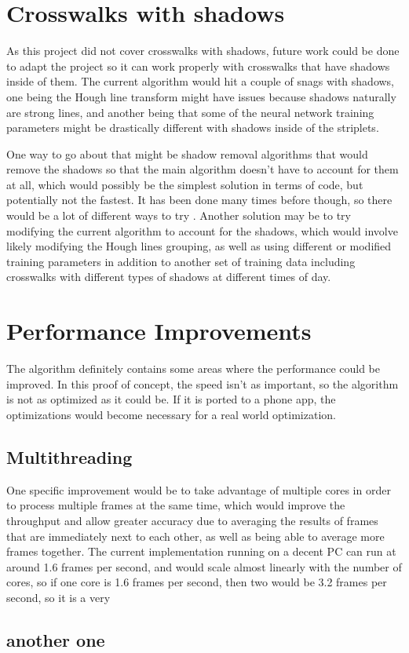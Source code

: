 \documentclass[12pt]{ucthesis}
\begin{document}
\section{Crosswalks with shadows}

As this project did not cover crosswalks with shadows, future work could be done to adapt the project so it can work properly with crosswalks that have shadows inside of them. The current algorithm would hit a couple of snags with shadows, one being the Hough line transform might have issues because shadows naturally are strong lines, and another being that some of the neural network training parameters might be drastically different with shadows inside of the striplets. 

One way to go about that might be shadow removal algorithms that would remove the shadows so that the main algorithm doesn't have to account for them at all, which would possibly be the simplest solution in terms of code, but potentially not the fastest. It has been done many times before though, so there would be a lot of different ways to try \cite{shadowRemoval}. Another solution may be to try modifying the current algorithm to account for the shadows, which would involve likely modifying the Hough lines grouping, as well as using different or modified training parameters in addition to another set of training data including crosswalks with different types of shadows at different times of day. 

\section{Performance Improvements}

The algorithm definitely contains some areas where the performance could be improved. In this proof of concept, the speed isn't as important, so the algorithm is not as optimized as it could be. If it is ported to a phone app, the optimizations would become necessary for a real world optimization.
\subsection{Multithreading}
One specific improvement would be to take advantage of multiple cores in order to process multiple frames at the same time, which would improve the throughput and allow greater accuracy due to averaging the results of frames that are immediately next to each other, as well as being able to average more frames together. 
The current implementation running on a decent PC can run at around 1.6 frames per second, and would scale almost linearly with the number of cores, so if one core is 1.6 frames per second, then two would be 3.2 frames per second, so it is a very 

\subsection{another one}





\clearpage


\end{document}

